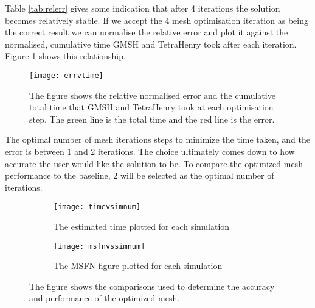 Table \ref{tab:relerr} gives some indication that after 4 iterations the solution becomes relatively stable. If we accept the 4 mesh optimisation iteration as being the correct result we can normalise the relative error and plot it against the normalised, cumulative time GMSH and TetraHenry took after each iteration. Figure \ref{fig:errvtime} shows this relationship.

\begin{figure}[H]
    \centering
    \texttt{[image: errvtime]}
    \caption{The figure shows the relative normalised error and the cumulative total time that GMSH and TetraHenry took at each optimisation step. The green line is the total time and the red line is the error.}
    \label{fig:errvtime}
\end{figure}

The optimal number of mesh iterations steps to minimize the time taken, and the error is between 1 and 2 iterations. The choice ultimately comes down to how accurate the user would like the solution to be. To compare the optimized mesh performance to the baseline, 2 will be selected as the optimal number of iterations.

\begin{figure}[H]
    \centering
    \begin{subfigure}[b]{0.48\textwidth}
        \centering
        \texttt{[image: timevsimnum]}
        \caption{The estimated time plotted for each simulation}
        \label{fig:timevssinnum}
    \end{subfigure}
    \hfill
    \begin{subfigure}[b]{0.48\textwidth}
        \centering
        \texttt{[image: msfnvssimnum]}
        \caption{The MSFN figure plotted for each simulation}
        \label{fig:msfnvssimnum}
    \end{subfigure}
    \caption{The figure shows the comparisons used to determine the accuracy and performance of the optimized mesh.}
    \label{fig:resCompOpt}
\end{figure}

